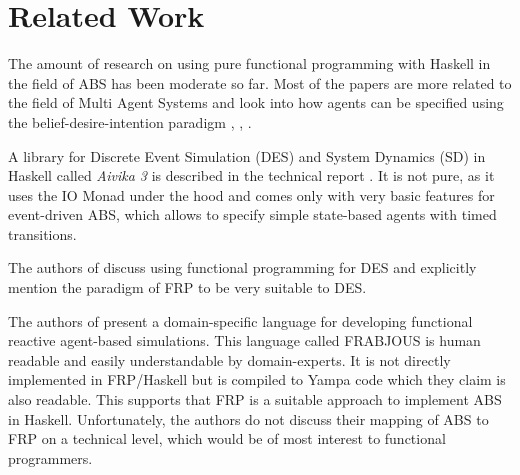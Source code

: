 \section{Related Work}
\label{sec:related_work}
The amount of research on using pure functional programming with Haskell in the field of ABS has been moderate so far. Most of the papers are more related to the field of Multi Agent Systems and look into how agents can be specified using the belief-desire-intention paradigm \cite{de_jong_suitability_2014}, \cite{sulzmann_specifying_2007}, \cite{jankovic_functional_2007}.

A library for Discrete Event Simulation (DES) and System Dynamics (SD) in Haskell called \textit{Aivika 3} is described in the technical report \cite{sorokin_aivika_2015}. It is not pure, as it uses the IO Monad under the hood and comes only with very basic features for event-driven ABS, which allows to specify simple state-based agents with timed transitions.

The authors of \cite{jankovic_functional_2007} discuss using functional programming for DES and explicitly mention the paradigm of FRP to be very suitable to DES.

The authors of \cite{vendrov_frabjous:_2014} present a domain-specific language for developing functional reactive agent-based simulations. This language called FRABJOUS is human readable and easily understandable by domain-experts. It is not directly implemented in FRP/Haskell but is compiled to Yampa code which they claim is also readable. This supports that FRP is a suitable approach to implement ABS in Haskell. Unfortunately, the authors do not discuss their mapping of ABS to FRP on a technical level, which would be of most interest to functional programmers.
